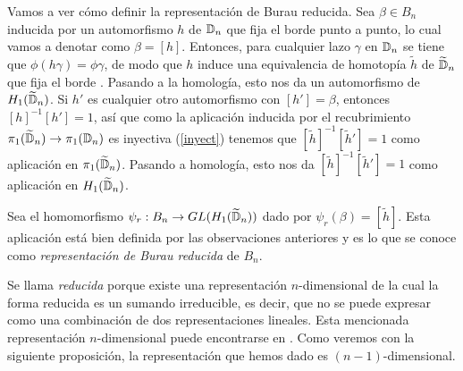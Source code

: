 \documentclass[TFG.tex]{subfiles}
\begin{document}


Vamos a ver cómo definir la representación de Burau reducida. Sea $\beta\in B_n$ inducida por un automorfismo $h$ de $\mathbb{D}_n$ que fija el borde punto a punto, lo cual vamos a denotar como $\beta=[h]$. Entonces, para cualquier lazo $\gamma$ en $\mathbb{D}_n$ se tiene que $\phi(h\gamma)=\phi\gamma$, de modo que $h$ induce una equivalencia de homotopía $\tilde{h}$ de $\widetilde{\mathbb{D}}_n$ que fija el borde \cite{Hatcher}. Pasando a la homología, esto nos da un automorfismo de $H_1(\widetilde{\mathbb{D}}_n)$. Si $h'$ es cualquier otro automorfismo con $[h']=\beta$, entonces $[h]^{-1}[h']=1$, así que como la aplicación inducida por el recubrimiento $\pi_1(\widetilde{\mathbb{D}}_n)\to\pi_1(\mathbb{D}_n)$ es inyectiva (\ref{inyect}) tenemos que $[\tilde{h}]^{-1}[\tilde{h}']=1$ como aplicación en $\pi_1(\widetilde{\mathbb{D}}_n)$. Pasando a homología, esto nos da $[\tilde{h}]^{-1}[\tilde{h}']=1$ como aplicación en $H_1(\widetilde{\mathbb{D}}_n)$. 






\begin{defi}
Sea el homomorfismo $\psi_r:B_n\to GL(H_1(\widetilde{\mathbb{D}}_n))$ dado por $\psi_r(\beta)=[\tilde{h}]$. Esta aplicación está bien definida por las observaciones anteriores y es lo que se conoce como \emph{representación de Burau reducida} de $B_n$.
\end{defi}

Se llama \emph{reducida} porque existe una representación $n$-dimensional de la cual la forma reducida es un sumando irreducible, es decir, que no se puede expresar como una combinación de dos representaciones lineales. Esta mencionada representación $n$-dimensional puede encontrarse en \cite{thesis}. Como veremos con la siguiente proposición, la representación que hemos dado es $(n-1)$-dimensional.

\end{document}
